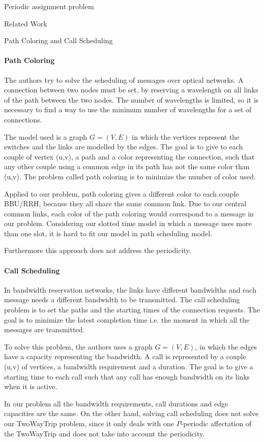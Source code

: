 \documentclass[a4paper,10pt]{report}
\begin{document}
\begin{chapter}{Periodic assignment problem}
\begin{section}{Related Work}
\begin{subsection}{Path Coloring and Call Scheduling}
\paragraph{Path Coloring}
The authors try to solve the scheduling of messages over optical networks. A connection between two nodes must be set, by reserving a wavelength on all links of the
path between the two nodes. The number of wavelengths is limited, so it is necessary to find a way to use the minimum number of wavelengths for a set 
of connections.

The model used is a graph $G=(V,E)$ in which the vertices represent the switches and the links are modelled by the edges. The goal is to give to each
couple of vertex (u,v), a path and a color representing the connection, such that any other couple using a common edge in its path has not the same
color than (u,v). The problem called path coloring is to minimize the number of color used.

Applied to our problem, path coloring gives a different color to each couple BBU/RRH, because they all share the same common link.
Due to our central common links, each color of the path coloring
would correspond to a message in our problem. Considering our slotted time model in which a message uses more than one slot,
it is hard to fit our model in path scheduling model.

Furthermore this approach does not address the periodicity. 

\paragraph{Call Scheduling}
In bandwidth reservation networks, the links have different bandwidths and each message 
needs a different bandwidth to be transmitted. The call scheduling problem is to set the paths and the starting times of the connection requests.
The goal is to minimize the latest completion time i.e. the moment in which all the messages are transmitted.

To solve this problem, the authors uses a graph $G=(V,E)$, in which the edges have a capacity representing the bandwidth.
A call is represented by a couple (u,v) of vertices, a bandwidth requirement and a duration. The goal is to give a starting time to each call
such that any call has enough bandwidth on its links when it is active.

In our problem all the bandwidth requirements, call durations and edge capacities are the same.
On the other hand, solving call scheduling does not solve our TwoWayTrip problem, since it only deals with one $P$-periodic affectation of the TwoWayTrip and does not take into account the periodicity.


\end{subsection}
\end{section}
\end{chapter}
\end{document}

